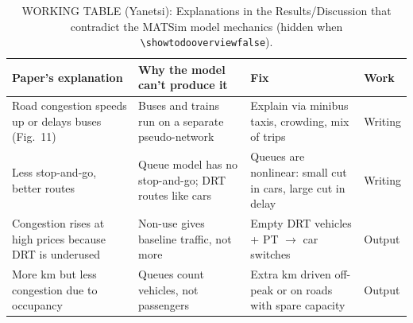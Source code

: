 \documentclass[preprint,12pt,authoryear]{elsarticle}
\newif\ifshowtodooverview
\begin{document}
\ifshowtodooverview
\begin{table}[H]
\centering
\caption{WORKING TABLE (Yanetsi): Explanations in the Results/Discussion that contradict the MATSim model mechanics (hidden when \texttt{\textbackslash showtodooverviewfalse}).}
\label{tab:yanetsi_model_contradictions}
\footnotesize
\begin{tabularx}{\textwidth}{>{\raggedright\arraybackslash}X >{\raggedright\arraybackslash}X >{\raggedright\arraybackslash}X l}
\toprule
\textbf{Paper's explanation} & \textbf{Why the model can't produce it} & \textbf{Fix} & \textbf{Work} \\
\midrule
Road congestion speeds up or delays buses (Fig.~11) & Buses and trains run on a separate pseudo-network & Explain via minibus taxis, crowding, mix of trips & Writing \\
\addlinespace
Less stop-and-go, better routes & Queue model has no stop-and-go; DRT routes like cars & Queues are nonlinear: small cut in cars, large cut in delay & Writing \\
\addlinespace
Congestion rises at high prices because DRT is underused & Non-use gives baseline traffic, not more & Empty DRT vehicles + PT $\rightarrow$ car switches & Output \\
\addlinespace
More km but less congestion due to occupancy & Queues count vehicles, not passengers & Extra km driven off-peak or on roads with spare capacity & Output \\
\bottomrule
\end{tabularx}
\end{table}
\end{document}

